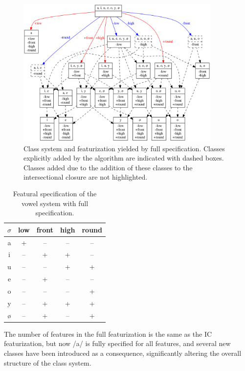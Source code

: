 \documentclass[12pt, oneside]{article}   	%
\begin{document}
\begin{figure}[htb!]
	\centering
	\includegraphics[width=0.9\textwidth]{vowel_inventory_full_FEATURAL.png}
	\caption{Class system and featurization yielded by full specification.  Classes explicitly added by the algorithm are indicated with dashed boxes. Classes added due to the addition of these classes to the intersectional closure are not highlighted.}
	\label{fig:vowel_inventory_full}
\end{figure}

\begin{table}[htb!]
	\centering
	\begin{tabular} {|c||c|c|c|c|}
		\hline
		$\sigma$ & low & front & high & round \\ \hline
		a & + & -- & -- & -- \\
		i & -- & + & + & -- \\
		u & -- & -- & + & + \\
		e & -- & + & -- & -- \\
		o & -- & -- & -- & + \\
		y & -- & + & + & + \\
		\o & -- & + & -- & + \\
		\hline
	\end{tabular}
	\caption{Featural specification of the vowel system with full specification.}
	\label{table:vowel_inventory_full}
\end{table}

The number of features in the full featurization is the same as the IC featurization, but now /a/ is fully specified for all features, and several new classes have been introduced as a consequence, significantly altering the overall structure of the class system.
\end{document}
